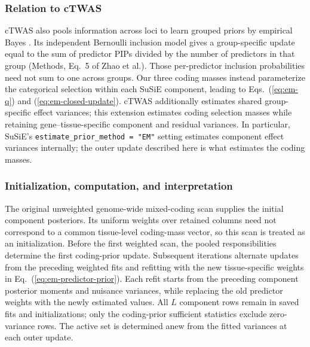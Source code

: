 \documentclass[12pt]{article}
\begin{document}
\subsubsection*{Relation to cTWAS}
cTWAS also pools information across loci to learn grouped priors by
empirical Bayes \cite{zhao_adjusting_2024}. Its independent Bernoulli
inclusion model gives a group-specific update equal to the sum of
predictor PIPs divided by the number of predictors in that group
(Methods, Eq.~5 of Zhao et al.). Those per-predictor inclusion
probabilities need not sum to one across groups. Our three coding masses
instead parameterize the categorical selection within each SuSiE
component, leading to Eqs.~(\ref{eq:em-q}) and
(\ref{eq:em-closed-update}). cTWAS additionally estimates shared
group-specific effect variances; this extension estimates coding
selection masses while retaining gene--tissue-specific component and
residual variances. In particular, SuSiE's
\texttt{estimate\_prior\_method = "EM"} setting estimates component
effect variances internally; the outer update described here is what
estimates the coding masses.

\subsubsection*{Initialization, computation, and interpretation}
The original unweighted genome-wide mixed-coding scan supplies the
initial component posteriors. Its uniform weights over retained columns
need not correspond to a common tissue-level coding-mass vector, so this
scan is treated as an initialization. Before the first weighted scan,
the pooled responsibilities determine the first coding-prior update.
Subsequent iterations alternate updates from the preceding weighted
fits and refitting with the new tissue-specific weights in
Eq.~(\ref{eq:em-predictor-prior}). Each refit starts from the preceding
component posterior moments and nuisance variances, while replacing the
old predictor weights with the newly estimated values. All $L$ component
rows remain in saved fits and initializations; only the coding-prior
sufficient statistics exclude zero-variance rows. The active set is
determined anew from the fitted variances at each outer update.
\end{document}

